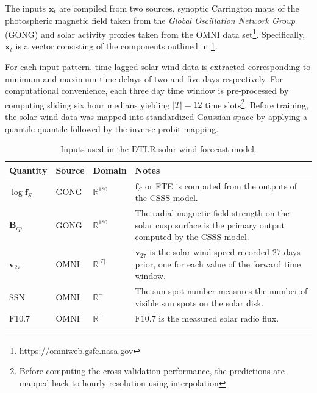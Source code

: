The inputs $\mathbf{x}_t$ are compiled from two sources, synoptic Carrington maps of the photospheric 
magnetic field taken from the \emph{Global Oscillation Network Group} (GONG) and solar activity 
proxies taken from the OMNI data set\footnote{\url{https://omniweb.gsfc.nasa.gov}}. Specifically, 
$\mathbf{x}_t$ is a vector consisting of the components outlined in \cref{table:dtlrInputs}.

For each input pattern, time lagged solar wind data is extracted corresponding to minimum and 
maximum time delays of two and five days respectively. For computational convenience, each three 
day time window is pre-processed by computing sliding six hour medians yielding $|T| = 12$ time 
slots\footnote{Before computing the cross-validation performance, the predictions are mapped back to 
hourly resolution using interpolation}. Before training, the solar wind data was 
mapped into standardized Gaussian space by applying a quantile-quantile followed 
by the inverse probit mapping.
%
\begin{table}[ht]
    \centering
    \begin{tabular}{l l l p{}}
        \hline
        \textbf{Quantity} & \textbf{Source} & \textbf{Domain} & \textbf{Notes}\\
        \hline
        \vspace{5pt}
          $\log \mathbf{f}_S$ & 
          GONG & 
          $\mathbb{R}^{180}$ & 
          $\mathbf{f}_S$ or FTE is computed from the outputs of the CSSS model.\\
          $\mathbf{B}_{cp}$ & 
          GONG & 
          $\mathbb{R}^{180}$  & 
          The radial magnetic field strength on the solar cusp surface is the primary output computed by the CSSS model.\\
          $\mathbf{v}_{27}$ & 
          OMNI & 
          $\mathbb{R}^{\rvert T \rvert}$ & 
          $\mathbf{v}_{27}$ is the solar wind speed recorded $27$ days prior, one for each value of the forward time window. \\
          $\mathrm{SSN}$ & OMNI & $\mathbb{R}^{+}$ & The sun spot number measures the number of visible sun spots on the solar disk. \\
          $\mathrm{F}10.7$ & OMNI & $\mathbb{R}^{+}$ & $\mathrm{F}10.7$ is the measured solar radio flux. \\
        \hline
    \end{tabular}
    \caption{Inputs used in the DTLR solar wind forecast model.}
    \label{table:dtlrInputs}
\end{table}

